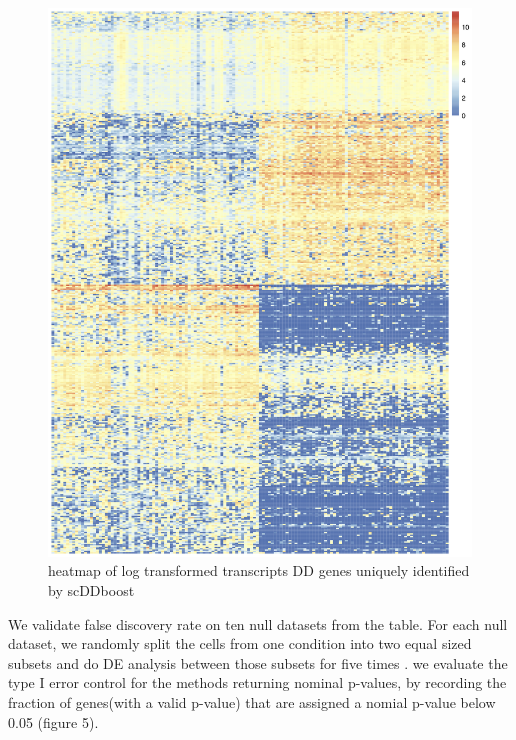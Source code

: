 \documentclass[11pt]{amsart}
\begin{document}
\begin{figure}[h]
\includegraphics[scale = 0.2]{heat2.png}
 \caption{heatmap of log transformed transcripts DD genes uniquely identified by scDDboost}
  \label{fig:5}
\end{figure}
\newpage
We validate false discovery rate on ten null datasets from the table. For each null dataset, we randomly split the cells from one condition into two equal sized subsets and do DE analysis between those subsets for five times . we evaluate the type I error control for the methods returning nominal p-values, by recording the fraction of genes(with a valid p-value) that are assigned a nomial p-value below 0.05 (figure 5).\\
\end{document}
